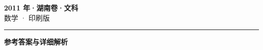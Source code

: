 \documentclass[zihao=5, a4paper]{ctexart}
\begin{document}
\begin{center}
  {\Large\bfseries 2011 年·湖南卷·文科}\\[4pt]
  {\large 数学 · 印刷版}
\end{center}
\medskip
{}

\par\bigskip\hrule\bigskip
{}
\begin{center}{\large\bfseries 参考答案与详细解析}\end{center}
\smallskip

\end{document}
